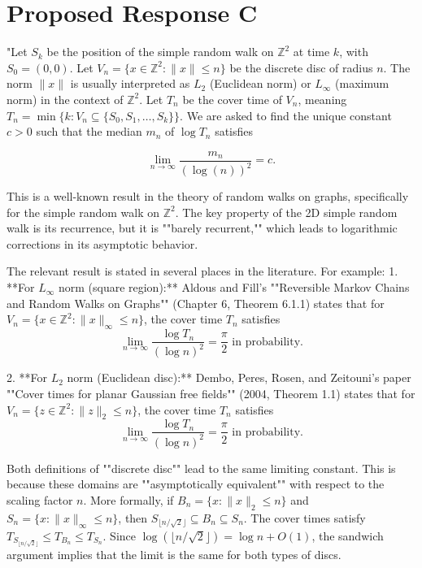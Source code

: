 \documentclass[11pt]{article}
\begin{document}
\section*{Proposed Response C}
"Let $S_k$ be the position of the simple random walk on $\mathbb{Z}^2$ at time $k$, with $S_0 = (0,0)$.
Let $V_n = \{x \in \mathbb{Z}^2 : \|x\| \leq n\}$ be the discrete disc of radius $n$. The norm $\|x\|$ is usually interpreted as $L_2$ (Euclidean norm) or $L_\infty$ (maximum norm) in the context of $\mathbb{Z}^2$. Let $T_n$ be the cover time of $V_n$, meaning $T_n = \min \{ k : V_n \subseteq \{S_0, S_1, \dots, S_k\} \}$.
We are asked to find the unique constant $c > 0$ such that the median $m_n$ of $\log T_n$ satisfies

$$
\lim _{n \rightarrow \infty} \frac{m_n}{(\log(n))^2} = c.
$$

This is a well-known result in the theory of random walks on graphs, specifically for the simple random walk on $\mathbb{Z}^2$. The key property of the 2D simple random walk is its recurrence, but it is ""barely recurrent,"" which leads to logarithmic corrections in its asymptotic behavior.

The relevant result is stated in several places in the literature. For example:
1.  **For $L_\infty$ norm (square region):** Aldous and Fill's ""Reversible Markov Chains and Random Walks on Graphs"" (Chapter 6, Theorem 6.1.1) states that for $V_n = \{x \in \mathbb{Z}^2 : \|x\|_\infty \leq n\}$, the cover time $T_n$ satisfies
    $$ \lim_{n \rightarrow \infty} \frac{\log T_n}{(\log n)^2} = \frac{\pi}{2} \text{ in probability.} $$

2.  **For $L_2$ norm (Euclidean disc):** Dembo, Peres, Rosen, and Zeitouni's paper ""Cover times for planar Gaussian free fields"" (2004, Theorem 1.1) states that for $V_n = \{z \in \mathbb{Z}^2 : \|z\|_2 \leq n\}$, the cover time $T_n$ satisfies
    $$ \lim_{n \rightarrow \infty} \frac{\log T_n}{(\log n)^2} = \frac{\pi}{2} \text{ in probability.} $$

Both definitions of ""discrete disc"" lead to the same limiting constant. This is because these domains are ""asymptotically equivalent"" with respect to the scaling factor $n$. More formally, if $B_n = \{x : \|x\|_2 \le n\}$ and $S_n = \{x : \|x\|_\infty \le n\}$, then $S_{\lfloor n/\sqrt{2} \rfloor} \subseteq B_n \subseteq S_n$. The cover times satisfy $T_{S_{\lfloor n/\sqrt{2} \rfloor}} \le T_{B_n} \le T_{S_n}$. Since $\log(\lfloor n/\sqrt{2} \rfloor) = \log n + O(1)$, the sandwich argument implies that the limit is the same for both types of discs.
\end{document}
